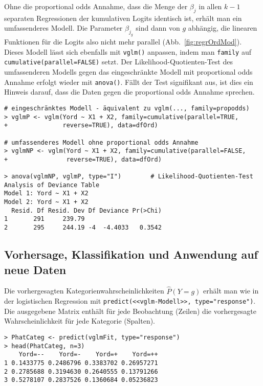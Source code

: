 Ohne die proportional odds Annahme, dass die Menge der $\beta_{j}$ in allen $k-1$ separaten Regressionen der kumulativen Logits identisch ist, erhält man ein umfassenderes Modell. Die Parameter $\beta_{j_{g}}$ sind dann von $g$ abhängig, die linearen Funktionen für die Logits also nicht mehr parallel (Abb.\ \ref{fig:regrOrdMod}). Dieses Modell lässt sich ebenfalls mit \lstinline!vglm()! anpassen, indem man \lstinline!family! auf \lstinline!cumulative(parallel=FALSE)! setzt. Der Likelihood-Quotienten-Test des umfassenderen Modells gegen das eingeschränkte Modell mit proportional odds Annahme erfolgt wieder mit \lstinline!anova()!. Fällt der Test signifikant aus, ist dies ein Hinweis darauf, dass die Daten gegen die proportional odds Annahme sprechen.
\begin{lstlisting}
# eingeschränktes Modell - äquivalent zu vglm(..., family=propodds)
> vglmP <- vglm(Yord ~ X1 + X2, family=cumulative(parallel=TRUE,
+               reverse=TRUE), data=dfOrd)

# umfassenderes Modell ohne proportional odds Annahme
> vglmNP <- vglm(Yord ~ X1 + X2, family=cumulative(parallel=FALSE,
+                reverse=TRUE), data=dfOrd)

> anova(vglmNP, vglmP, type="I")        # Likelihood-Quotienten-Test
Analysis of Deviance Table
Model 1: Yord ~ X1 + X2
Model 2: Yord ~ X1 + X2
  Resid. Df Resid. Dev Df Deviance Pr(>Chi)
1       291     239.79                     
2       295     244.19 -4  -4.4033   0.3542
\end{lstlisting}

\subsection{Vorhersage, Klassifikation und Anwendung auf neue Daten}

Die vorhergesagten Kategorienwahrscheinlichkeiten $\hat{P}(Y = g)$ erhält man wie in der logistischen Regression mit \lstinline!predict(<<vglm-Modell>>, type="response")!. Die ausgegebene Matrix enthält für jede Beobachtung (Zeilen) die vorhergesagte Wahrscheinlichkeit für jede Kategorie (Spalten).
\begin{lstlisting}
> PhatCateg <- predict(vglmFit, type="response")
> head(PhatCateg, n=3)
    Yord=--    Yord=-    Yord=+    Yord=++
1 0.1433775 0.2486796 0.3383702 0.26957271
2 0.2785688 0.3194630 0.2640555 0.13791266
3 0.5278107 0.2837526 0.1360684 0.05236823
\end{lstlisting}

